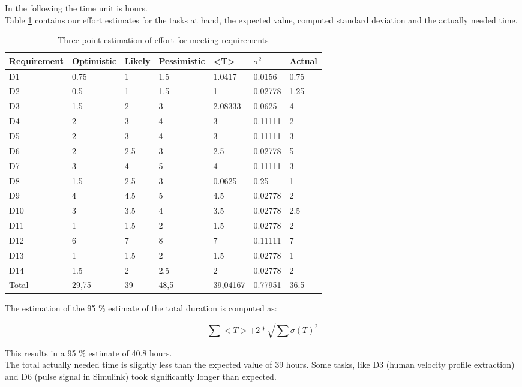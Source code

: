 In the following the time unit is hours.\\
Table \ref{tbl:D1_effort_estimation} contains our effort estimates for the tasks at hand, the expected value, computed standard deviation and the actually needed time.
\begin{table}[H]
\centering
\caption{Three point estimation of effort for meeting requirements}
\begin{adjustbox}{width=1\textwidth, center=\textwidth}
\renewcommand{\arraystretch}{1}
\begin{tabular}{lllllll}
\textbf{Requirement} & \textbf{Optimistic} & \textbf{Likely} & \textbf{Pessimistic} & \textbf{<T>} & \textbf{$\sigma^2$} & \textbf{Actual}\\\hline
	D1 & 0.75 & 1 & 1.5 & 1.0417 & 0.0156 & 0.75 \\
	D2 & 0.5 & 1 & 1.5 & 1 & 0.02778 & 1.25 \\
	D3 & 1.5 & 2 & 3 & 2.08333 & 0.0625 & 4 \\
	D4 & 2 & 3 & 4 & 3 & 0.11111 & 2 \\
	D5 & 2 & 3 & 4 & 3 & 0.11111 & 3 \\
	D6 & 2 & 2.5 & 3 & 2.5 & 0.02778 & 5 \\
	D7 & 3 & 4 & 5 & 4 & 0.11111 & 3 \\
	D8 & 1.5 & 2.5 & 3 & 0.0625 & 0.25 & 1 \\
	D9 & 4 & 4.5 & 5 & 4.5 & 0.02778& 2 \\
	D10 & 3 & 3.5 & 4 & 3.5 & 0.02778 & 2.5 \\
	D11 & 1 & 1.5 & 2 & 1.5 & 0.02778 & 2 \\
	D12 & 6 & 7 & 8 & 7 & 0.11111 & 7 \\
	D13 & 1 & 1.5 & 2 & 1.5 & 0.02778 & 1 \\
	D14 & 1.5 & 2 & 2.5 & 2 & 0.02778 & 2 \\\hline
	Total & 29,75 & 39 & 48,5 & 39,04167 & 0.77951 & 36.5
\end{tabular}
\end{adjustbox}
\label{tbl:D1_effort_estimation}
\end{table}

The estimation of the 95 \% estimate of the total duration is computed as:

\begin{equation}
	\sum <T> + 2*\sqrt{\sum \sigma(T)^2}
\end{equation}

This results in a 95 \% estimate of 40.8 hours.\\
The total actually needed time is slightly less than the expected value of 39 hours.
Some tasks, like D3 (human velocity profile extraction) and D6 (pulse signal in Simulink) took significantly longer than expected.


